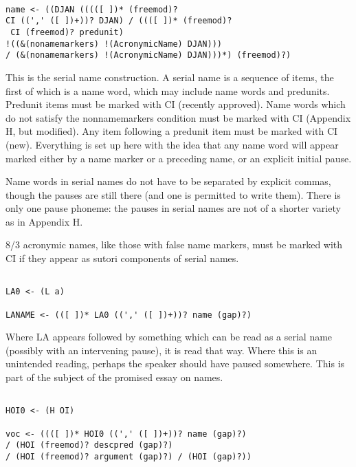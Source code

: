 \documentclass[12pt]{article}
\begin{document}
\begin{verbatim}

name <- ((DJAN (((([ ])* (freemod)? 
CI ((',' ([ ])+))? DJAN) / ((([ ])* (freemod)?
 CI (freemod)? predunit) 
!((&(nonamemarkers) !(AcronymicName) DJAN))) 
/ (&(nonamemarkers) !(AcronymicName) DJAN)))*) (freemod)?)

\end{verbatim}

This is the serial name construction.  A serial name is a sequence of items, the first of which is a name word, which may include name words and predunits.  Predunit items must be marked with CI (recently approved).  Name words which do not satisfy the nonnamemarkers condition must be marked with CI (Appendix H, but modified).  Any item following a predunit item must be marked with CI (new).  Everything is set up here with the idea that any name word will appear marked either by a name marker
or a preceding name, or an explicit initial pause.

Name words in serial names do not have to be separated by explicit commas, though the pauses are still there (and one is permitted to write them).  There is only one pause phoneme:  the pauses in serial names are not of a shorter variety as in Appendix H.

8/3 acronymic names, like those with false name markers, must be marked with CI if they appear as sutori components of serial names.

\begin{verbatim}

LA0 <- (L a)

LANAME <- (([ ])* LA0 ((',' ([ ])+))? name (gap)?)

\end{verbatim}

Where LA appears followed by something which can be read as a serial name (possibly with an intervening pause), it is read that way.  Where this is an unintended
reading, perhaps the speaker should have paused somewhere.   This is part of the subject of the promised essay on names.

\begin{verbatim}

HOI0 <- (H OI)

voc <- ((([ ])* HOI0 ((',' ([ ])+))? name (gap)?) 
/ (HOI (freemod)? descpred (gap)?) 
/ (HOI (freemod)? argument (gap)?) / (HOI (gap)?))

\end{verbatim}
\end{document}
